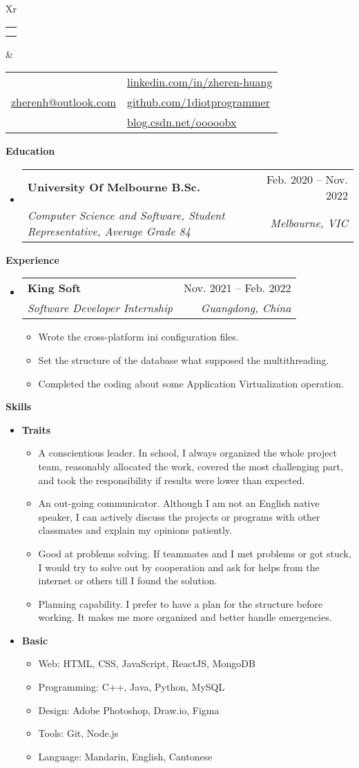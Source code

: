 \documentclass[letterpaper,12pt]{article}[leftmargin=*]
\makeatletter
\def \fullname {Zheren Huang}
\def \subtitle {}
\def \linkedinicon {\faLinkedin}
\def \linkedinlink {https://linkedin.com/in/zheren-huang-9133a6235/}
\def \linkedintext {linkedin.com/in/zheren-huang}
\def \phoneicon {\faPhone}
\def \phonetext {+61 466641756}
\def \emailicon {\faEnvelope}
\def \emaillink {mailto:zherenh@outlook.com}
\def \emailtext {zherenh@outlook.com}
\def \githubicon {\faGithub}
\def \githublink {https://github.com/1diotprogrammer}
\def \githubtext {github.com/1diotprogrammer}
\def \websiteicon {\faGlobe}
\def \websitelink {https://blog.csdn.net/ooooobx?spm=1000.2115.3001.5343}
\def \websitetext {blog.csdn.net/ooooobx}
\def \headertype {\doublecol}
\def \entryspacing {-0pt}
\def \linkedin {\linkedinicon \hspace{3pt}\href{\linkedinlink}{\linkedintext}}
\def \phone {\phoneicon \hspace{3pt}{ \phonetext}}
\def \email {\emailicon \hspace{3pt}\href{\emaillink}{\emailtext}}
\def \github {\githubicon \hspace{3pt}\href{\githublink}{\githubtext}}
\def \website {\websiteicon \hspace{3pt}\href{\websitelink}{\websitetext}}
\renewcommand{\section}[2]{\vspace{5pt}
  \colorbox{secondary}{\color{white}\raggedbottom\normalsize\textbf{{#1}{\hspace{7pt}#2}}}
}
\newcommand{\resumeEntryStart}{\begin{itemize}[leftmargin=2.5mm]}
\newcommand{\resumeEntryEnd}{\end{itemize}\vspace{\entryspacing}}
\newcommand{\resumeItemListStart}{\begin{itemize}[leftmargin=4.5mm]}
\newcommand{\resumeItemListEnd}{\end{itemize}}
\newcommand{\resumeItem}[1]{
  \item\small{
    {#1 \vspace{-2pt}}
  }
}
\newcommand{\resumeEntryTSDL}[4]{
  \vspace{-1pt}\item[]
    \begin{tabularx}{0.97\textwidth}{X@{\hspace{60pt}}r}
      \textbf{\color{primary}#1} & {\firabook\color{accent}\small#2} \\
      \textit{\color{accent}\small#3} & \textit{\color{accent}\small#4} \\
    \end{tabularx}\vspace{-6pt}
}
\newcommand{\resumeEntryS}[2]{
  \item[]\small{
    \textbf{\color{primary}#1 }{ #2 \vspace{-6pt}}
  }
}
\newcommand{\doublecol}[6]{
  \begin{tabularx}{\textwidth}{Xr}
    {
      \begin{tabular}[c]{l}
        \fontsize{35}{45}\selectfont{\color{primary}{{\textbf{\fullname}}}} \\
        {\textit{\subtitle}} 
      \end{tabular}
    } & {
      \begin{tabular}[c]{l@{\hspace{1.5em}}l}
        {\small#4} & {\small#1} \\
        {\small#5} & {\small#2} \\
        {\small#6} & {\small#3}
      \end{tabular}
    }
  \end{tabularx}
}
\makeatother
\begin{document}
\headertype{\linkedin}{\github}{\website}{\phone}{\email}{} 
\vspace{-10pt}  


\section{\faGraduationCap}{Education}

  \resumeEntryStart
    \resumeEntryTSDL
      {University Of Melbourne B.Sc.}{Feb. 2020 -- Nov. 2022}
      {Computer Science and Software, Student Representative, Average Grade 84}{Melbourne, VIC}
  \resumeEntryEnd
  


\section{\faPieChart}{Experience}

  \resumeEntryStart
    \resumeEntryTSDL
      {King Soft}{Nov. 2021 -- Feb. 2022}
      {Software Developer Internship}{Guangdong, China}
    \resumeItemListStart
      \resumeItem {Wrote the cross-platform ini configuration files.}
      \resumeItem {Set the structure of the database what supposed the multithreading.}
      \resumeItem {Completed the coding about some Application Virtualization operation.}
    \resumeItemListEnd
  \resumeEntryEnd
  

\section{\faGears}{Skills}
 \resumeEntryStart
  \resumeEntryS{Traits } {}
      \resumeItemListStart
      \resumeItem{A conscientious leader. In school, I always organized the whole project team, reasonably allocated the work, covered the most challenging part, and took the responsibility if results were lower than expected.}
      \resumeItem{An out-going communicator. Although I am not an English native speaker, I can actively discuss the projects or programs with other classmates and explain my opinions patiently.}
      \resumeItem{Good at problems solving. If teammates and I met problems or got stuck, I would try to solve out by cooperation and ask for helps from the internet or others till I found the solution.}
      \resumeItem{Planning capability. I prefer to have a plan for the structure before working. It makes me more organized and better handle emergencies.}
      \resumeItemListEnd
  \resumeEntryS{Basic } {}
      \resumeItemListStart
      \resumeItem{Web: HTML, CSS, JavaScript, ReactJS, MongoDB}
      \resumeItem{Programming: C++, Java, Python, MySQL}
      \resumeItem{Design: Adobe Photoshop, Draw.io, Figma}
      \resumeItem{Tools: Git, Node.js}
      \resumeItem{Language: Mandarin, English, Cantonese}
      \resumeItemListEnd
 \resumeEntryEnd
\end{document}
